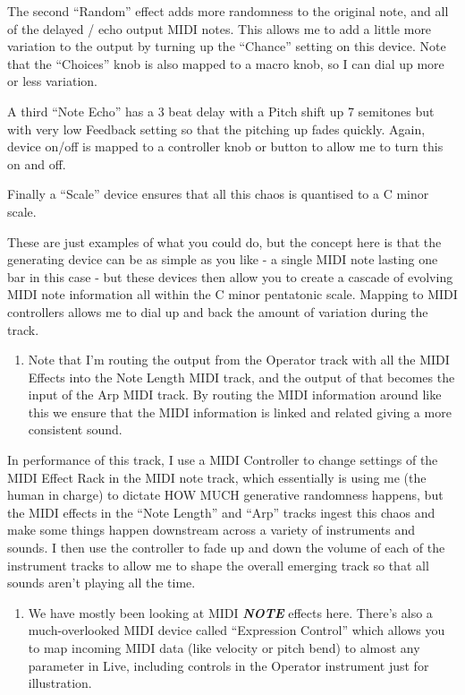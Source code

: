 \documentclass[
  12pt,
  letterpaper,
  oneside,
  open=any]{scrbook}
\providecommand{\tightlist}{%
  \setlength{\itemsep}{0pt}\setlength{\parskip}{0pt}}\usepackage{longtable,booktabs,array}
\begin{document}
The second ``Random'' effect adds more randomness to the original note,
and all of the delayed / echo output MIDI notes. This allows me to add a
little more variation to the output by turning up the ``Chance'' setting
on this device. Note that the ``Choices'' knob is also mapped to a macro
knob, so I can dial up more or less variation.

A third ``Note Echo'' has a 3 beat delay with a Pitch shift up 7
semitones but with very low Feedback setting so that the pitching up
fades quickly. Again, device on/off is mapped to a controller knob or
button to allow me to turn this on and off.

Finally a ``Scale'' device ensures that all this chaos is quantised to a
C minor scale.

These are just examples of what you could do, but the concept here is
that the generating device can be as simple as you like - a single MIDI
note lasting one bar in this case - but these devices then allow you to
create a cascade of evolving MIDI note information all within the C
minor pentatonic scale. Mapping to MIDI controllers allows me to dial up
and back the amount of variation during the track.

\begin{enumerate}
\def\labelenumi{\arabic{enumi}.}
\setcounter{enumi}{7}
\tightlist
\item
  Note that I'm routing the output from the Operator track with all the
  MIDI Effects into the Note Length MIDI track, and the output of that
  becomes the input of the Arp MIDI track. By routing the MIDI
  information around like this we ensure that the MIDI information is
  linked and related giving a more consistent sound.
\end{enumerate}

In performance of this track, I use a MIDI Controller to change settings
of the MIDI Effect Rack in the MIDI note track, which essentially is
using me (the human in charge) to dictate HOW MUCH generative randomness
happens, but the MIDI effects in the ``Note Length'' and ``Arp'' tracks
ingest this chaos and make some things happen downstream across a
variety of instruments and sounds. I then use the controller to fade up
and down the volume of each of the instrument tracks to allow me to
shape the overall emerging track so that all sounds aren't playing all
the time.

\begin{enumerate}
\def\labelenumi{\arabic{enumi}.}
\setcounter{enumi}{8}
\tightlist
\item
  We have mostly been looking at MIDI \textbf{\emph{NOTE}} effects here.
  There's also a much-overlooked MIDI device called ``Expression
  Control'' which allows you to map incoming MIDI data (like velocity or
  pitch bend) to almost any parameter in Live, including controls in the
  Operator instrument just for illustration.
\end{enumerate}
\end{document}
